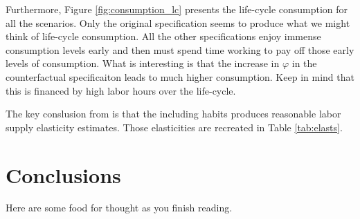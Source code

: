 \documentclass[ProjectMMD]{subfiles}
\begin{document}
\renewcommand{\figName}{consumption_lc}
\renewcommand{\figFile}{\figName}
\hypertarget{\figFile}{}

Furthermore, Figure \ref{fig:consumption_lc} presents the life-cycle consumption for all the scenarios. Only the original specification seems to produce what we might think of life-cycle consumption. All the other specifications enjoy immense consumption levels early and then must spend time working to pay off those early levels of consumption. What is interesting is that the increase in $\varphi$ in the counterfactual specificaiton leads to much higher consumption. Keep in mind that this is financed by high labor hours over the life-cycle. 


The key conslusion from \cite{bover1991relaxing} is that the including habits produces reasonable labor supply elasticity estimates. Those elasticities are recreated in Table \ref{tab:elasts}. 




\hypertarget{Conclusions}{}
\section{Conclusions}

Here are some food for thought as you finish reading.





\onlyinsubfile{}
%
\end{document}

